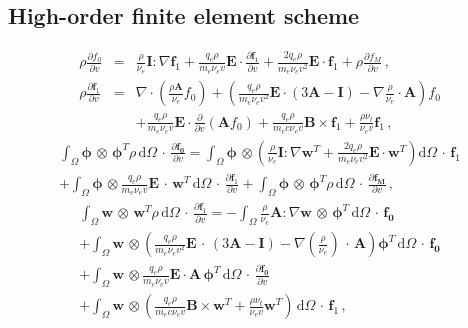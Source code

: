 \documentclass[review]{elsarticle}
\newcommand{\pdv}[2]{\frac{\partial{#1}}{\partial{#2}}}
\newcommand{\vect}[1]{\boldsymbol{#1}}
\newcommand{\matr}[1]{\mathbf{#1}}
\newcommand{\dI}{\text{d}}
\newcommand{\nuee}{\nu_{e}}
\newcommand{\nutot}{\nu_{t}}
\newcommand{\vmag}{v}
\newcommand{\E}{\vect{E}}
\newcommand{\B}{\vect{B}}
\newcommand{\qe}{q_e}
\newcommand{\me}{m_e}
\newcommand{\fM}{f_M}
\newcommand{\fzero}{f_0}
\newcommand{\fone}{\vect{f}_1}
\newcommand{\MI}{\matr{I}}
\newcommand{\MA}{\matr{A}}
\begin{document}
\subsection{High-order finite element scheme}\label{sec:hos}
\begin{eqnarray}
  \rho \pdv{\fzero}{\vmag} &=& 
  \frac{\rho}{\nuee}\MI:\nabla\fone + 
  \frac{\qe\rho}{\me\nuee\vmag}\E\cdot\pdv{\fone}{\vmag}
  + \frac{2 \qe\rho}{\me\nuee\vmag^2}\E\cdot\fone + \rho \pdv{\fM}{\vmag}\, , 
  \label{eq:M1hosf0}\\
  \rho \pdv{\fone}{\vmag} &=&
  \nabla\cdot\left(\frac{\rho\MA}{\nuee}\fzero\right) +
  \left(\frac{\qe\rho}{\me\nuee\vmag^2}\E\cdot\left( 3\MA - \MI \right) - 
  \nabla\frac{\rho}{\nuee}\cdot\MA \right)\fzero \nonumber\\
  &&+ \frac{\qe\rho}{\me\nuee\vmag}\E\cdot\pdv{}{\vmag}
  \left( \MA\fzero\right) + \frac{\qe\rho}{\me c \nuee\vmag}\B\times\fone + 
  \frac{\rho \nutot}{\nuee\vmag}\fone\, ,
  \label{eq:M1hosf1}
\end{eqnarray}
\begin{multline}
  \int_{\Omega}\vect{\phi}\, \otimes\, \vect{\phi}^T 
  \rho\, \dI \Omega\, \cdot\, \pdv{\vect{\fzero}}{\vmag} = 
  \int_{\Omega}\vect{\phi}\, \otimes \left(
  \frac{\rho}{\nuee}\MI:\nabla\vect{w}^T + 
  \frac{2 \qe\rho}{\me\nuee\vmag^2}\E\cdot\vect{w}^T \right)\dI \Omega
  \, \cdot\, \fone \\
  + \int_{\Omega}\vect{\phi}\, \otimes
  \frac{\qe\rho}{\me\nuee\vmag}\E\, \cdot\, \vect{w}^T\, \dI \Omega\, 
  \cdot\, \pdv{\fone}{\vmag} + 
  \int_{\Omega}\vect{\phi}\, \otimes\, \vect{\phi}^T \rho\, \dI\Omega\,
  \cdot\, \pdv{\vect{\fM}}{\vmag}
  \, , 
  \label{eq:M1hosf0}
\end{multline}
\begin{multline}
  \int_{\Omega}\vect{w}\, \otimes\, \vect{w}^T \rho\, \dI\Omega\, \cdot\,  
  \pdv{\fone}{\vmag} =
  - \int_{\Omega}\frac{\rho}{\nuee} \MA : \nabla\vect{w}\, \otimes\,
  \vect{\phi}^T\, \dI \Omega\, 
  \cdot\, \vect{\fzero} \\
  + \int_{\Omega}\vect{w}\, \otimes
  \left(\frac{\qe\rho}{\me\nuee\vmag^2}\E\, \cdot\, \left( 3\MA - \MI \right) - 
  \nabla\left(\frac{\rho}{\nuee}\right)\, \cdot\, \MA \right)\vect{\phi}^T\, 
  \dI\Omega\, \cdot\, \vect{\fzero} \\
  + \int_{\Omega}\vect{w}\, \otimes
  \frac{\qe\rho}{\me\nuee\vmag}\E \cdot \MA\, \vect{\phi}^T\, \dI \Omega\, 
  \cdot\, \pdv{\vect{\fzero}}{\vmag}\\
  + \int_{\Omega}\vect{w}\, \otimes
  \left(\frac{\qe\rho}{\me c \nuee\vmag}\B\times\vect{w}^T + 
  \frac{\rho \nutot}{\nuee\vmag} \vect{w}^T\right)\, \dI\Omega\, 
  \cdot\, \fone\, ,
  \label{eq:M1hosf1}
\end{multline}
\cite{Dobrev_Kolev_Rieben-High-order_curvilinear_finite_element_methods_for_Lagrangian_hydrodynamics}
\end{document}
